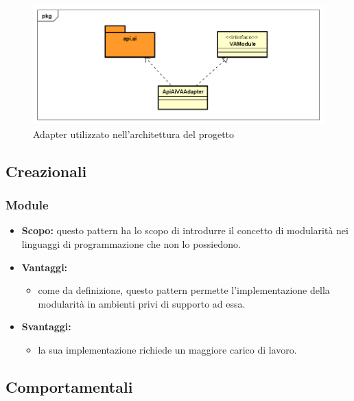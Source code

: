 \begin{figure}[h]
		\centering
	\includegraphics[width=\textwidth,height=\textheight,keepaspectratio,scale=0.1]{images/diagrams/back-end/Official_Backend_0304/Adapter.png}
	\caption{Adapter utilizzato nell'architettura del progetto \PROGETTO}\label{fig:adapter2}
\end{figure}
	\newpage
  \subsection{Creazionali}

	 \subsubsection{Module}
      \begin{itemize}
       \item \textbf{Scopo:} questo pattern ha lo scopo di introdurre il concetto di modularità nei linguaggi di programmazione che non lo possiedono.
	\item \textbf{Vantaggi:}
	  \begin{itemize}
	   \item come da definizione, questo pattern permette l'implementazione della modularità in ambienti privi di supporto ad essa.
	  \end{itemize}
	\item \textbf{Svantaggi:}
	  \begin{itemize}
	   \item la sua implementazione richiede un maggiore carico di lavoro.
	  \end{itemize}
	\end{itemize}
	  \newpage
  \subsection{Comportamentali}
